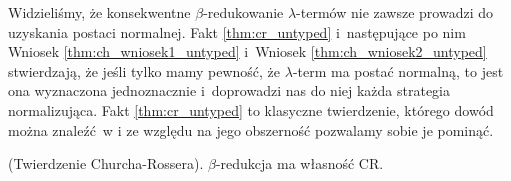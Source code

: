 Widzieliśmy, że konsekwentne \(\beta\)-redukowanie \(\lambda\)-termów nie zawsze prowadzi do uzyskania postaci normalnej. Fakt \ref{thm:cr_untyped} i~następujące po nim Wniosek \ref{thm:ch_wniosek1_untyped} i~Wniosek \ref{thm:ch_wniosek2_untyped} stwierdzają, że jeśli tylko mamy pewność, że \(\lambda\)-term ma postać normalną, to jest ona wyznaczona jednoznacznie i~doprowadzi nas do niej każda strategia normalizująca. Fakt \ref{thm:cr_untyped} to klasyczne twierdzenie, którego dowód można znaleźć w \cite[Rozdział 3.2]{Barendregt_1984} i ze względu na jego obszerność pozwalamy sobie je pominąć. 

\begin{fakt}(Twierdzenie Churcha-Rossera)\label{thm:cr_untyped}. 
\(\beta\)-redukcja ma własność CR. 
\end{fakt}

